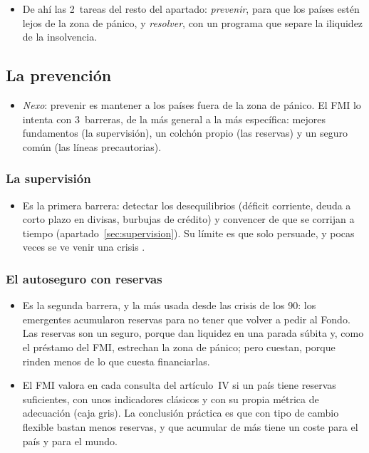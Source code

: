 \documentclass[11pt]{article}
\begin{document}
\begin{itemize}
\item De ahí las 2~tareas del resto del apartado: \emph{prevenir}, para que los países estén lejos de la zona de pánico, y \emph{resolver}, con un programa que separe la iliquidez de la insolvencia.
\end{itemize}

\subsection{La prevención}\label{sec:prevencion}

\begin{itemize}
\item \emph{Nexo}: prevenir es mantener a los países fuera de la zona de pánico. El FMI lo intenta con 3~barreras, de la más general a la más específica: mejores fundamentos (la supervisión), un colchón propio (las reservas) y un seguro común (las líneas precautorias).
\end{itemize}

\subsubsection{La supervisión}\label{sec:prevencion-supervision}

\begin{itemize}
\item Es la primera barrera: detectar los desequilibrios (déficit corriente, deuda a corto plazo en divisas, burbujas de crédito) y convencer de que se corrijan a tiempo (apartado~\ref{sec:supervision}). Su límite es que solo persuade, y pocas veces se ve venir una crisis .
\end{itemize}

\subsubsection{El autoseguro con reservas}\label{sec:reservas}

\begin{itemize}
\item Es la segunda barrera, y la más usada desde las crisis de los 90: los emergentes acumularon reservas para no tener que volver a pedir al Fondo. Las reservas son un seguro, porque dan liquidez en una parada súbita y, como el préstamo del FMI, estrechan la zona de pánico; pero cuestan, porque rinden menos de lo que cuesta financiarlas.
\item El FMI valora en cada consulta del artículo~IV si un país tiene reservas suficientes, con unos indicadores clásicos y con su propia métrica de adecuación (caja gris). La conclusión práctica es que con tipo de cambio flexible bastan menos reservas, y que acumular de más tiene un coste para el país y para el mundo.
\end{itemize}
\end{document}
